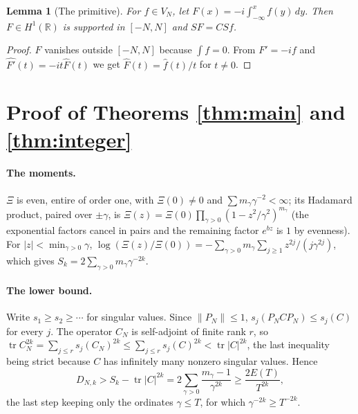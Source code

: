 \documentclass[11pt,a4paper]{article}
\theoremstyle{plain}
\newtheorem{lemma}[theorem]{Lemma}
\theoremstyle{remark}
\DeclareMathOperator{\tr}{tr}
\newcommand{\R}{\mathbb R}
\begin{document}
\begin{lemma}[The primitive]\label{lem:prim}
For $f\in V_N$, let $F(x)=-i\int_{-\infty}^xf(y)\,dy$. Then $F\in H^1(\R)$ is supported in $[-N,N]$ and $SF=CSf$.
\end{lemma}
\begin{proof}
$F$ vanishes outside $[-N,N]$ because $\int f=0$. From $F'=-if$ and $\widehat{F'}(t)=-it\widehat F(t)$ we get
$\widehat F(t)=\widehat f(t)/t$ for $t\ne0$.
\end{proof}

\section{Proof of Theorems \ref{thm:main} and \ref{thm:integer}}\label{sec:proof1}

\paragraph{The moments.}
$\Xi$ is even, entire of order one, with $\Xi(0)\ne0$ and $\sum m_\gamma\gamma^{-2}<\infty$; its Hadamard product,
paired over $\pm\gamma$, is $\Xi(z)=\Xi(0)\prod_{\gamma>0}(1-z^2/\gamma^2)^{m_\gamma}$ (the exponential factors cancel
in pairs and the remaining factor $e^{bz}$ is $1$ by evenness). For $|z|<\min_{\gamma>0}\gamma$,
$\log(\Xi(z)/\Xi(0))=-\sum_{\gamma>0}m_\gamma\sum_{j\ge1}z^{2j}/(j\gamma^{2j})$, which gives
$S_k=2\sum_{\gamma>0}m_\gamma\gamma^{-2k}$.

\paragraph{The lower bound.}
Write $s_1\ge s_2\ge\cdots$ for singular values. Since $\|P_N\|\le1$, $s_j(P_NCP_N)\le s_j(C)$ for every $j$. The
operator $C_N$ is self-adjoint of finite rank $r$, so
$\tr C_N^{2k}=\sum_{j\le r}s_j(C_N)^{2k}\le\sum_{j\le r}s_j(C)^{2k}<\tr|C|^{2k}$, the last inequality being strict
because $C$ has infinitely many nonzero singular values. Hence
\[
 D_{N,k}>S_k-\tr|C|^{2k}=2\sum_{\gamma>0}\frac{m_\gamma-1}{\gamma^{2k}}\ge\frac{2E(T)}{T^{2k}},
\]
the last step keeping only the ordinates $\gamma\le T$, for which $\gamma^{-2k}\ge T^{-2k}$.
\end{document}
